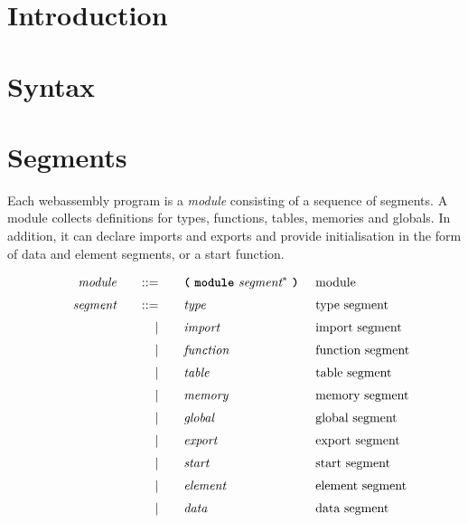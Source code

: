 


% 

%

\newpage

% 

\section{Introduction}



\newpage

\section{Syntax}



\section{Segments}

Each webassembly program is a \textit{module} consisting of a sequence of segments. A module collects definitions for types, functions, tables, memories and globals. In addition, it can declare imports and exports and provide initialisation in the form of data and element segments, or a start function.

\begin{alignat*}{9}
	&& \textit{module}    &&\quad ::= &\quad && \textbf{\texttt{(}}\ \textbf{\texttt{module}}\  \textit{segment}^*\ \textbf{\texttt{)}}\  && \textrm{module}\\[1mm]
	&& \textit{segment}    &&\quad ::= &\quad && \textit{type}&& \textrm{type segment} \\[1mm]
	&& 					   &&\quad 	|  &\quad && \textit{import}&& \textrm{import segment} \\[1mm]
	&& 					   &&\quad 	|  &\quad && \textit{function}&& \textrm{function segment} \\[1mm]
	&& 					   &&\quad 	|  &\quad && \textit{table}&& \textrm{table segment} \\[1mm]
	&& 					   &&\quad 	|  &\quad && \textit{memory}&& \textrm{memory segment} \\[1mm]
	&& 					   &&\quad 	|  &\quad && \textit{global}&& \textrm{global segment} \\[1mm]
	&& 					   &&\quad 	|  &\quad && \textit{export}&& \textrm{export segment} \\[1mm]
	&& 					   &&\quad 	|  &\quad && \textit{start}&& \textrm{start segment} \\[1mm]
	&& 					   &&\quad 	|  &\quad && \textit{element}&& \textrm{element segment} \\[1mm]
	&& 					   &&\quad 	|  &\quad && \textit{data}&& \textrm{data segment} \\[1mm]
\end{alignat*}

